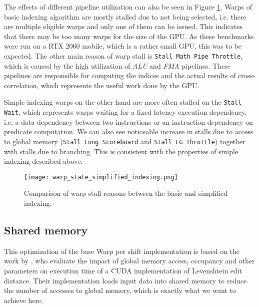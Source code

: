 The effects of different pipeline utilization can also be seen in Figure \ref{fig:warp_state_simplified_indexing}. Warps of basic indexing algorithm are mostly stalled due to not being selected, i.e. there are multiple eligible warps and only one of them can be issued. This indicates that there may be too many warps for the size of the GPU. As these benchmarks were run on a RTX 2060 mobile, which is a rather small GPU, this was to be expected. The other main reason of warp stall is \texttt{Stall Math Pipe Throttle}, which is caused by the high utilization of \textit{ALU} and \textit{FMA} pipelines. These pipelines are responsible for computing the indices and the actual results of cross-correlation, which represents the useful work done by the GPU.

Simple indexing warps on the other hand are more often stalled on the \texttt{Stall Wait}, which represents warps waiting for a fixed latency execution dependency, i.e. a data dependency between two instructions or an instruction dependency on predicate computation. We can also see noticeable increase in stalls due to access to global memory (\texttt{Stall Long Scoreboard} and \texttt{Stall LG Throttle}) together with stalls due to branching. This is consistent with the properties of simple indexing described above.

\begin{figure}[ht]
	\centering
	\texttt{[image: warp\_state\_simplified\_indexing.png]}
	\caption{Comparison of warp stall reasons between the basic and simplified indexing.}
	\label{fig:warp_state_simplified_indexing}
\end{figure}

\subsection{Shared memory}
\label{sec:warp_per_shift_shared_mem}

This optimization of the base Warp per shift implementation is based on the work by \citet{paper:parameter_optimization}, who evaluate the impact of global memory access, occupancy and other parameters on execution time of a CUDA implementation of Levenshtein edit distance. Their implementation loads input data into shared memory to reduce the number of accesses to global memory, which is exactly what we want to achieve here.

